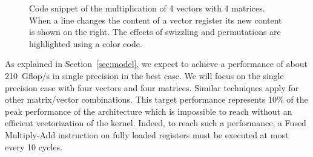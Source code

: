 \documentclass[10pt,conference,compsocconf]{IEEEtran}
\begin{document}
\begin{figure}
  \centering
{}%

\caption{Code snippet of the multiplication of 4 vectors with 4
  matrices. When a line changes the content of a vector register its
  new content is shown on the right. The effects of swizzling and
  permutations are highlighted using a color code.}
\label{code:mat_mul}
\end{figure}



As explained in Section~\ref{sec:model}, we expect to achieve a performance of
about 210~Gflop/s in single precision in the best case. We will focus
on the single precision case with four vectors and four matrices. 
Similar techniques apply for other matrix/vector combinations. This target
performance represents 10\% of the peak performance of the
architecture which is impossible to reach without an efficient vectorization of
the kernel. Indeed, to reach such a performance, a Fused Multiply-Add
instruction on fully loaded registers must be executed at most every
10 cycles.
\end{document}
